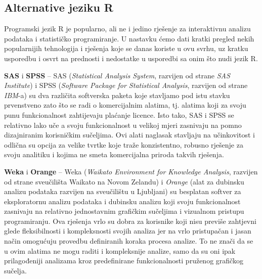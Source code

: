 \documentclass[]{book}
\theoremstyle{definition}
\theoremstyle{definition}
\theoremstyle{definition}
\theoremstyle{remark}
\begin{document}
\subsection{Alternative jeziku R}\label{alternative-jeziku-r}

Programski jezik R je popularno, ali ne i jedino rješenje za
interaktivnu analizu podataka i statističko programiranje. U nastavku
ćemo dati kratki pregled nekih popularnijih tehnologija i rješenja koje
se danas koriste u ovu svrhu, uz kratku usporedbu i osvrt na prednosti i
nedostatke u usporedbi sa onim što nudi jezik R.

\textbf{SAS} i \textbf{SPSS} -- SAS (\emph{Statistical Analysis System},
razvijen od strane \emph{SAS Institute}) i SPSS (\emph{Software Package
for Statistical Analysis}, razvijen od strane \emph{IBM}-a) su dva
različita softverska paketa koje stavljamo pod istu stavku prvenstveno
zato što se radi o komercijalnim alatima, tj. alatima koji za svoju punu
funkcionalnost zahtijevaju plaćanje licence. Isto tako, SAS i SPSS se
relativno lako uče a svoju funkcionalnost u velikoj mjeri zasnivaju na
pomno dizajniranim korisničkim sučeljima. Ovi alati naglasak stavljaju
na učinkovitost i odlična su opcija za velike tvrtke koje traže
konzistentno, robusno rješenje za svoju analitiku i kojima ne smeta
komercijalna priroda takvih rješenja.

\textbf{Weka} i \textbf{Orange} -- Weka (\emph{Waikato Environment for
Knowledge Analysis}, razvijen od strane sveučilišta Waikato na Novom
Zelandu) i \emph{Orange} (alat za dubinsku analizu podataka razvijen na
sveučilištu u Ljubljani) su besplatan softver za eksploratornu analizu
podataka i dubinsku analizu koji svoju funkcionalnost zasnivaju na
relativno jednostavnim grafičkim sučeljima i vizualnom pristupu
programiranju. Ova rješenja vrlo su dobra za korisnike koji nisu previše
zahtjevni glede fleksibilnosti i kompleksnosti svojih analiza jer na
vrlo pristupačan i jasan način omogućuju provedbu definiranih koraka
procesa analize. To ne znači da se u ovim alatima ne mogu raditi i
kompleksnije analize, samo da su oni ipak prilagođeniji analizama kroz
predefinirane funkcionalnosti pruženog grafičkog sučelja.
\end{document}
